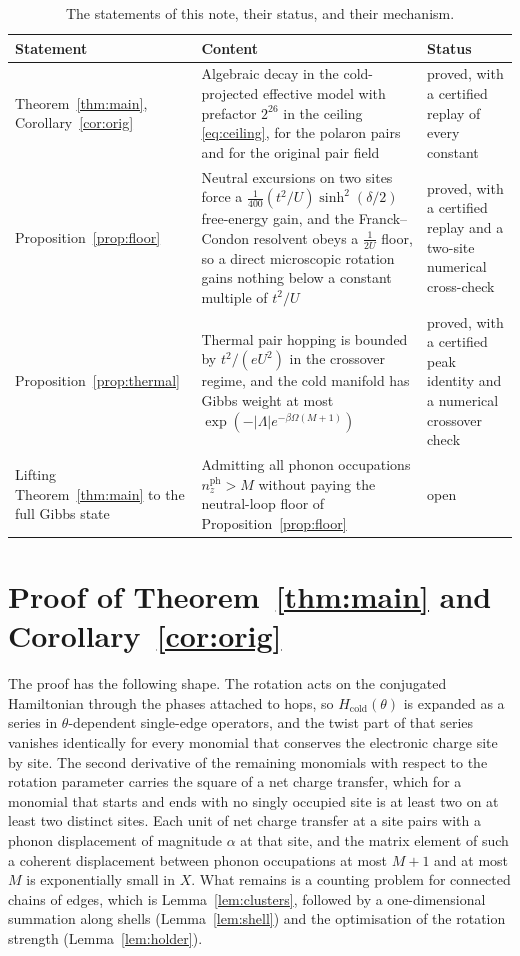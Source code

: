 \documentclass[11pt]{article}
\theoremstyle{plain}
\theoremstyle{definition}
\begin{document}
\begin{table}[t]
\centering
\small
\begin{tabular}{@{}L{0.30\textwidth}L{0.40\textwidth}L{0.22\textwidth}@{}}
\hline
Statement & Content & Status \\
\hline
Theorem~\ref{thm:main}, Corollary~\ref{cor:orig} &
Algebraic decay in the cold-projected effective model with prefactor
$2^{26}$ in the ceiling \eqref{eq:ceiling}, for the polaron pairs and for the
original pair field &
proved, with a certified replay of every constant \\
Proposition~\ref{prop:floor} &
Neutral excursions on two sites force a
$\tfrac{1}{400}(t^{2}/U)\sinh^{2}(\delta/2)$ free-energy gain, and the
Franck--Condon resolvent obeys a $\tfrac{1}{2U}$ floor, so a direct microscopic
rotation gains nothing below a constant multiple of $t^{2}/U$ &
proved, with a certified replay and a two-site numerical cross-check \\
Proposition~\ref{prop:thermal} &
Thermal pair hopping is bounded by $t^{2}/(eU^{2})$ in the crossover regime,
and the cold manifold has Gibbs weight at most
$\exp(-|\Lambda|e^{-\beta\Omega(M+1)})$ &
proved, with a certified peak identity and a numerical crossover check \\
Lifting Theorem~\ref{thm:main} to the full Gibbs state &
Admitting all phonon occupations $n^{\mathrm{ph}}_z>M$ without paying the
neutral-loop floor of Proposition~\ref{prop:floor} &
open \\
\hline
\end{tabular}
\caption{The statements of this note, their status, and their mechanism.}
\label{tab:claims}
\end{table}

\section{Proof of Theorem~\ref{thm:main} and Corollary~\ref{cor:orig}}\label{sec:proof}

The proof has the following shape. The rotation acts on the conjugated Hamiltonian
through the phases attached to hops, so $H_{\mathrm{cold}}(\theta)$ is expanded as
a series in $\theta$-dependent single-edge operators, and the twist part of that
series vanishes identically for every monomial that conserves the electronic
charge site by site. The second derivative of the remaining monomials with respect
to the rotation parameter carries the square of a net charge transfer, which for a
monomial that starts and ends with no singly occupied site is at least two on at
least two distinct sites. Each unit of net charge transfer at a site pairs with a
phonon displacement of magnitude $\alpha$ at that site, and the matrix element of
such a coherent displacement between phonon occupations at most $M+1$ and at most
$M$ is exponentially small in $X$. What remains is a counting problem for
connected chains of edges, which is Lemma~\ref{lem:clusters}, followed by a
one-dimensional summation along shells (Lemma~\ref{lem:shell}) and the
optimisation of the rotation strength (Lemma~\ref{lem:holder}).
\end{document}
